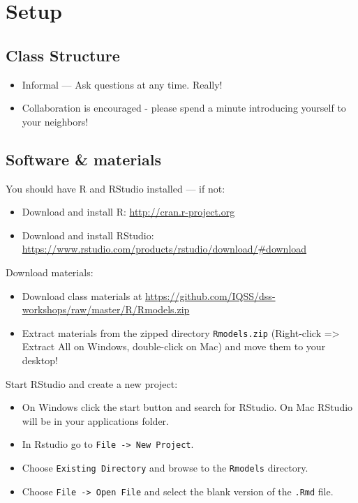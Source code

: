 \documentclass[]{book}
\providecommand{\tightlist}{%
  \setlength{\itemsep}{0pt}\setlength{\parskip}{0pt}}
\begin{document}
\hypertarget{setup-1}{%
\section{Setup}\label{setup-1}}

\hypertarget{class-structure-1}{%
\subsection{Class Structure}\label{class-structure-1}}

\begin{itemize}
\tightlist
\item
  Informal --- Ask questions at any time. Really!
\item
  Collaboration is encouraged - please spend a minute introducing yourself to your neighbors!
\end{itemize}

\hypertarget{software-materials-1}{%
\subsection{Software \& materials}\label{software-materials-1}}

You should have R and RStudio installed --- if not:

\begin{itemize}
\tightlist
\item
  Download and install R: \url{http://cran.r-project.org}
\item
  Download and install RStudio: \url{https://www.rstudio.com/products/rstudio/download/\#download}
\end{itemize}

Download materials:

\begin{itemize}
\tightlist
\item
  Download class materials at \url{https://github.com/IQSS/dss-workshops/raw/master/R/Rmodels.zip}
\item
  Extract materials from the zipped directory \texttt{Rmodels.zip} (Right-click =\textgreater{} Extract All on Windows, double-click on Mac) and move them to your desktop!
\end{itemize}

Start RStudio and create a new project:

\begin{itemize}
\tightlist
\item
  On Windows click the start button and search for RStudio. On Mac
  RStudio will be in your applications folder.
\item
  In Rstudio go to \texttt{File\ -\textgreater{}\ New\ Project}.
\item
  Choose \texttt{Existing\ Directory} and browse to the \texttt{Rmodels} directory.
\item
  Choose \texttt{File\ -\textgreater{}\ Open\ File} and select the blank version of the \texttt{.Rmd} file.
\end{itemize}
\end{document}
